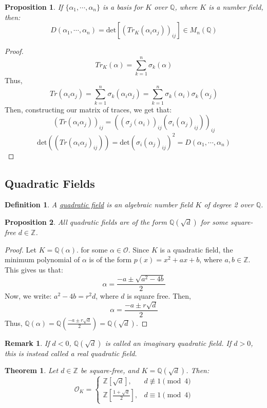 \documentclass{article}
\newcommand{\air}{\mathcal{O}_K}
\newcommand{\Q}{\mathbb{Q}}
\newcommand{\Z}{\mathbb{Z}}
\newtheorem{theorem}{Theorem}[subsection]
\newtheorem{remark}{Remark}[subsection]
\newtheorem{proposition}{Proposition}[subsection]
\newtheorem{definition}{Definition}[subsection]
\begin{document}
\begin{proposition}
If $\{\alpha_1,\cdots, \alpha_n\}$ is a basis for $K$ over $\Q$, where $K$ is a number field, then:
$$D(\alpha_1,\cdots, \alpha_n)=\text{det}[(Tr_K(\alpha_i\alpha_j))_{ij}]\in M_n(\Q)$$
\end{proposition}
\begin{proof}
$$Tr_K(\alpha)=\sum_{k=1}^n\sigma_k(\alpha)$$
Thus,
$$Tr(\alpha_i\alpha_j)=\sum_{k=1}^n\sigma_k(\alpha_i\alpha_j)=\sum_{k=1}^n\sigma_k(\alpha_i)\sigma_k(\alpha_j)$$
Then, constructing our matrix of traces, we get that:
$$(Tr(\alpha_i\alpha_j))_{ij}=((\sigma_j(\alpha_i))_{ij}(\sigma_i(\alpha_j)_{ij}))_{ij}$$
$$\text{det}((Tr(\alpha_i\alpha_j)_{ij}))= \text{det}(\sigma_i(\alpha_j)_{ij})^2 = D(\alpha_1,\cdots, \alpha_n)$$
\end{proof}
\newpage
\subsection{Quadratic Fields}
\begin{definition}
A \underline{quadratic field} is an algebraic number field $K$ of degree 2 over $\Q$.
\end{definition}
\begin{proposition}
All quadratic fields are of the form $\Q(\sqrt{d})$ for some square-free $d\in\Z$. 
\end{proposition}
\begin{proof}
Let $K=\Q(\alpha)$. for some $\alpha\in\mathcal{O}$. Since $K$ is a quadratic field, the minimum polynomial of $\alpha$ is of the form $p(x)=x^2+ax+b$, where $a,b\in\Z$. This gives us that:
$$\alpha = \frac{-a\pm \sqrt{a^2-4b}}{2}$$
Now, we write: $a^2-4b= r^2d$, where $d$ is square free. Then, 
$$\alpha = \frac{-a\pm r\sqrt{d}}{2}$$
Thus, $\Q(\alpha)=\Q\left(\frac{-a\pm r\sqrt{d}}{2}\right)=\Q(\sqrt{d})$.
\end{proof}
\begin{remark}
If $d<0$, $\Q(\sqrt{d})$ is called an imaginary quadratic field. If $d>0$, this is instead called a real quadratic field. 
\end{remark}
  \begin{theorem}
  Let $d\in\Z$ be square-free, and $K=\Q(\sqrt{d})$. Then:
  \begin{equation*}\air = \begin{cases}
  \Z[\sqrt{d}], &d\not\equiv 1\pmod{4}\\
  \Z\left[\frac{1+\sqrt{d}}{2}\right], &d\equiv 1\pmod{4}
  \end{cases}
  \end{equation*}
  \end{theorem}
\end{document}
